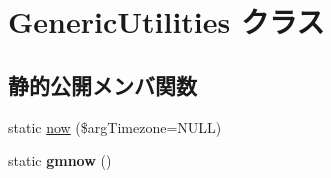 \hypertarget{class_generic_utilities}{}\section{Generic\+Utilities クラス}
\label{class_generic_utilities}
\subsection*{静的公開メンバ関数}
\begin{DoxyCompactItemize}
\item 
static \hyperlink{class_generic_utilities_a971617b6c6f04ccc72224f2eee1d3614}{now} (\$arg\+Timezone=N\+U\+L\+L)
\item 
\hypertarget{class_generic_utilities_a0ae7b3746e5a864a78639ce9e4366a8b}{}static {\bfseries gmnow} ()\label{class_generic_utilities_a0ae7b3746e5a864a78639ce9e4366a8b}


\end{DoxyCompactItemize}
